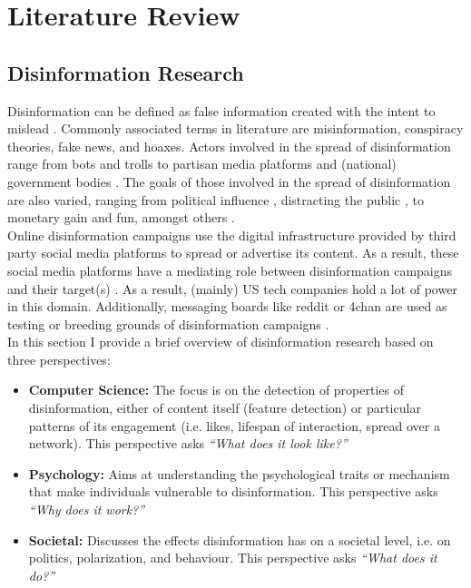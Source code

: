 \section{Literature Review}

\subsection{Disinformation Research}
Disinformation can be defined as false information created with the intent to mislead \citep{Fallis2015}.  Commonly associated terms in literature are misinformation, conspiracy theories, fake news, and hoaxes. Actors involved in the spread of disinformation range from bots and trolls to partisan media platforms and (national) government bodies \citep{Tucker2018}. The goals of those involved in the spread of disinformation are also varied, ranging from political influence \citep{keller2020political}, distracting the public \citep{king2017chinese}, to monetary gain and fun, amongst others  \citep{hrvckova2019unravelling}. \\ Online disinformation campaigns use the digital infrastructure provided by third party social media platforms to spread or advertise its content. As a result, these social media platforms have a mediating role between disinformation campaigns and their target(s) \citep{Bessi2015}. As a result, (mainly) US tech companies hold a lot of power in this domain. Additionally, messaging boards like reddit or 4chan are used as testing or breeding grounds of disinformation campaigns \citep{Morgan2018}.  \\

In this section I provide a brief overview of disinformation research based on three perspectives:
\begin{itemize}
	\item \textbf{Computer Science:} The focus is on the detection of properties of disinformation, either of content itself (feature detection) or particular patterns of its engagement (i.e. likes, lifespan of interaction, spread over a network). This perspective asks \textit{``What does it look like?''}
	\item \textbf{Psychology:} Aims at understanding the psychological traits or mechanism that make individuals vulnerable to disinformation. This perspective asks \textit{``Why does it work?''}
	\item \textbf{Societal:} Discusses the effects disinformation has on a societal level, i.e. on politics, polarization, and behaviour. This perspective asks \textit{``What does it do?''}
\end{itemize}

